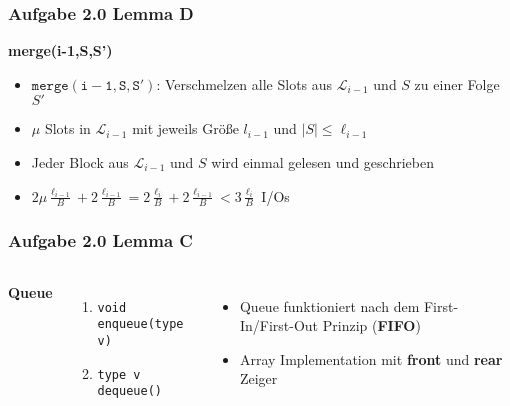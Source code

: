 \documentclass[aspectratio=169]{beamer}
\begin{document}
\begin{frame}
\frametitle{Aufgabe 2.0 Lemma D}

\textbf{merge(i-1,S,S')}
\begin{itemize}
	\item $\mathtt{merge(i-1,S,S')}$: Verschmelzen alle Slots aus $\mathcal{L}_{i-1}$ und $S$ zu einer Folge $S'$
	\item $\mu$ Slots in $\mathcal{L}_{i-1}$ mit jeweils Größe $l_{i-1}$ und $|S| \leq  \ell_{i-1}$
	\item Jeder Block aus $\mathcal{L}_{i-1}$ und $S$ wird einmal gelesen und geschrieben 
	\item $2\mu\frac{\ell_{i-1}}{B} + 2\frac{\ell_{i-1}}{B} = 2\frac{\ell_{i}}{B} + 2\frac{\ell_{i-1}}{B} < 3\frac{\ell_i}{B}$ I/Os
\end{itemize}

\end{frame}

\begin{frame}
\frametitle{Aufgabe 2.0 Lemma C}
\begin{columns}[c] %
	
	\textbf{Queue}
	\begin{enumerate}
		\item \texttt{void enqueue(type v)}
		\item \texttt{type v dequeue()}
	\end{enumerate}
	
	\begin{itemize}
		\item Queue funktioniert nach dem First-In/First-Out Prinzip (\textbf{FIFO})
		\item Array Implementation mit \textbf{front} und \textbf{rear} Zeiger
	\end{itemize}
	
\end{columns}
\end{frame}
\end{document}
